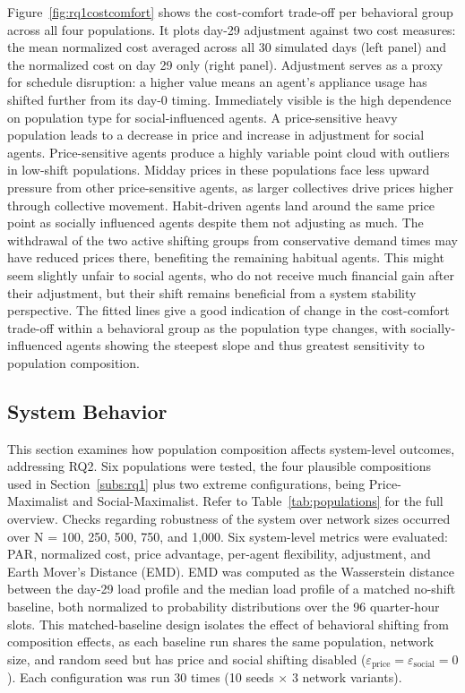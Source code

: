 \documentclass[11pt, a4paper]{article}
\begin{document}
Figure~\ref{fig:rq1costcomfort} shows the cost-comfort trade-off per behavioral group across all four populations. It plots day-29 adjustment against two cost measures: the mean normalized cost averaged across all 30 simulated days (left panel) and the normalized cost on day 29 only (right panel). Adjustment serves as a proxy for schedule disruption: a higher value means an agent's appliance usage has shifted further from its day-0 timing. Immediately visible is the high dependence on population type for social-influenced agents. A price-sensitive heavy population leads to a decrease in price and increase in adjustment for social agents. Price-sensitive agents produce a highly variable point cloud with outliers in low-shift populations. Midday prices in these populations face less upward pressure from other price-sensitive agents, as larger collectives drive prices higher through collective movement. Habit-driven agents land around the same price point as socially influenced agents despite them not adjusting as much. The withdrawal of the two active shifting groups from conservative demand times may have reduced prices there, benefiting the remaining habitual agents. This might seem slightly unfair to social agents, who do not receive much financial gain after their adjustment, but their shift remains beneficial from a system stability perspective. The fitted lines give a good indication of change in the cost-comfort trade-off within a behavioral group as the population type changes, with socially-influenced agents showing the steepest slope and thus greatest sensitivity to population composition.

\subsection{System Behavior} \label{subs:rq2}
This section examines how population composition affects system-level outcomes, addressing RQ2. Six populations were tested, the four plausible compositions used in Section~\ref{subs:rq1} plus two extreme configurations, being Price-Maximalist and Social-Maximalist. Refer to Table~\ref{tab:populations} for the full overview. Checks regarding robustness of the system over network sizes occurred over N = 100, 250, 500, 750, and 1,000. Six system-level metrics were evaluated: PAR, normalized cost, price advantage, per-agent flexibility, adjustment, and Earth Mover's Distance (EMD). EMD was computed as the Wasserstein distance between the day-29 load profile and the median load profile of a matched no-shift baseline, both normalized to probability distributions over the 96 quarter-hour slots. This matched-baseline design isolates the effect of behavioral shifting from composition effects, as each baseline run shares the same population, network size, and random seed but has price and social shifting disabled ($\varepsilon_{\text{price}} = \varepsilon_{\text{social}} = 0$). Each configuration was run 30 times (10 seeds $\times$ 3 network variants).
\end{document}
